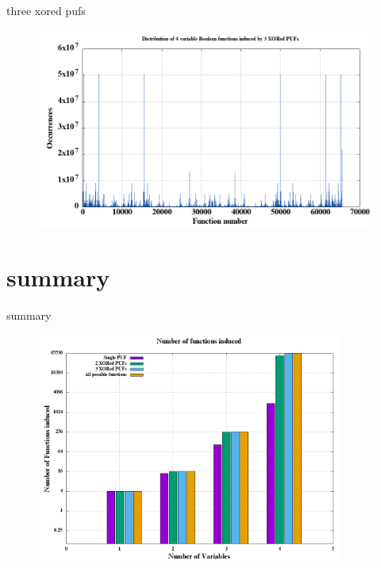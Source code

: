 \documentclass[10pt, compress]{beamer}
\begin{document}
\begin{frame}{three xored pufs}
    \begin{figure}
        \centering
        \includegraphics[width=\textwidth]{figures/dist/distribution_of_4-variable_boolean_functions_induced_by_3_xored_pufs.png}
    \end{figure}
\end{frame}

\section{summary}

\begin{frame}{summary}
    \begin{figure}
        \centering
        \includegraphics[width=0.9\textwidth]{figures/hist.png}
    \end{figure}
\end{frame}
\end{document}

